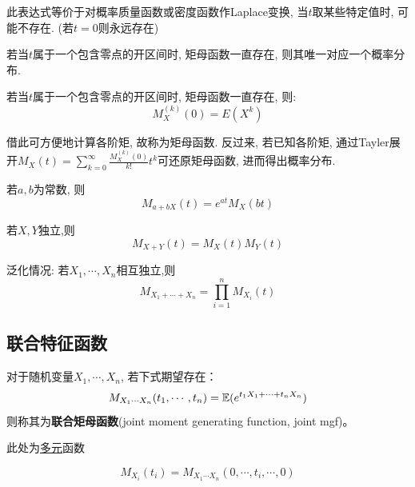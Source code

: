 \begin{remark}
    此表达式等价于对概率质量函数或密度函数作Laplace变换, 当$t$取某些特定值时, 可能不存在. (若$t=0$则永远存在)
\end{remark}

\begin{theorem}
    若当$t$属于一个包含零点的开区间时, 矩母函数一直存在, 则其唯一对应一个概率分布.
\end{theorem}

\begin{theorem}
    若当$t$属于一个包含零点的开区间时, 矩母函数一直存在, 则:
    \[ M_X^{(k)}(0) = E(X^k) \]
\end{theorem}

\begin{remark}
    借此可方便地计算各阶矩, 故称为矩母函数. 反过来, 若已知各阶矩, 通过Tayler展开$M_X(t)=\sum_{k=0}^{\infty}\frac{M_X^{(k)}(0)}{k!}t^k$可还原矩母函数, 进而得出概率分布.
\end{remark}

\begin{proposition}
    若$a,b$为常数, 则
    \[ M_{a+b X}(t) = e^{a t}M_X(b t) \]
\end{proposition}

\begin{theorem}\label{thm:mgf_sum}
    若$X,Y$独立,则
    \[ M_{X+Y}(t) = M_X(t) M_Y(t) \]

    泛化情况: 若$X_1,\cdots, X_n$相互独立,则
    \[ M_{X_1+\cdots+ X_n} = \prod_{i=1}^n M_{X_i}(t)\]
\end{theorem}

\subsection{联合特征函数}

\begin{definition}
    对于随机变量$X_1,\cdots, X_n$, 若下式期望存在：
    \[ M_{X_1\cdots X_n}(t_1,\cdots ,t_n) = \mathbb{E}(e^{t_1 X_1+\cdots + t_n X_n}) \]
    则称其为\textbf{联合矩母函数}(joint moment generating function, joint mgf)。
\end{definition}

\begin{remark}
    此处为\underline{多元}函数
\end{remark}

\begin{proposition}
    \[ M_{X_i}(t_i) = M_{X_1\cdots X_n}(0,\cdots ,t_i,\cdots ,0) \]
\end{proposition}

